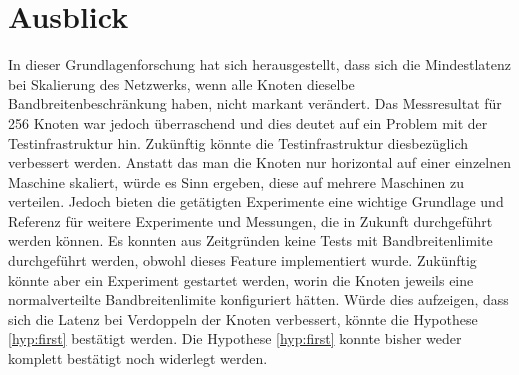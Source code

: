 \chapter{Ausblick}\label{ch:Ausblick}

In dieser Grundlagenforschung hat sich herausgestellt,
dass sich die Mindestlatenz bei Skalierung des Netzwerks,
wenn alle Knoten dieselbe Bandbreitenbeschränkung haben,
nicht markant verändert.
Das Messresultat für 256 Knoten war jedoch überraschend und dies deutet auf ein Problem mit der Testinfrastruktur hin.
Zukünftig könnte die Testinfrastruktur diesbezüglich verbessert werden.
Anstatt das man die Knoten nur horizontal auf einer einzelnen Maschine skaliert, würde es Sinn ergeben, diese auf mehrere Maschinen zu verteilen.
Jedoch bieten die getätigten Experimente eine wichtige Grundlage und Referenz für weitere Experimente und Messungen, die in Zukunft durchgeführt werden können.
Es konnten aus Zeitgründen keine Tests mit Bandbreitenlimite durchgeführt werden, obwohl dieses Feature implementiert wurde.
Zukünftig könnte aber ein Experiment gestartet werden, worin die Knoten jeweils eine normalverteilte Bandbreitenlimite konfiguriert hätten. 
Würde dies aufzeigen, dass sich die Latenz bei Verdoppeln der Knoten verbessert, könnte die Hypothese \ref{hyp:first} bestätigt werden.
Die Hypothese \ref{hyp:first} konnte bisher weder komplett bestätigt noch widerlegt werden.

